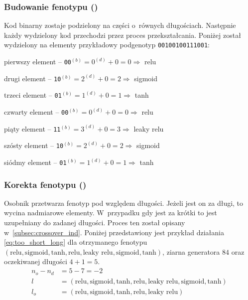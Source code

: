 \tocless\subsubsection{%
  Budowanie fenotypu
  ()%
}
Kod binarny zostaje podzielony
na części o~równych długościach.
Następnie każdy wydzielony kod przechodzi
przez proces przekształcania.
Poniżej został wydzielony na elementy
przykładowy podgenotyp \texttt{00100100111001}:
\begin{nospitemize}
  \item pierwszy element
    -- \texttt{00}$\displaystyle
      {}^{\left(b\right)}
        =0^{\left(d\right)}+0
        =0
    \Rightarrow$ relu
  \item drugi element
    -- \texttt{10}$\displaystyle
      {}^{\left(b\right)}
        =2^{\left(d\right)}+0
        =2
    \Rightarrow$ sigmoid
  \item trzeci element
    -- \texttt{01}$\displaystyle
      {}^{\left(b\right)}
        =1^{\left(d\right)}+0
        =1
    \Rightarrow$ tanh
  \item czwarty element
    -- \texttt{00}$\displaystyle
      {}^{\left(b\right)}
        =0^{\left(d\right)}+0
        =0
    \Rightarrow$ relu
  \item piąty element
    -- \texttt{11}$\displaystyle
      {}^{\left(b\right)}
        =3^{\left(d\right)}+0
        =3
    \Rightarrow$ leaky relu
  \item szósty element
    -- \texttt{10}$\displaystyle
      {}^{\left(b\right)}
        =2^{\left(d\right)}+0
        =2
    \Rightarrow$ sigmoid
  \item siódmy element
    -- \texttt{01}$\displaystyle
      {}^{\left(b\right)}
        =1^{\left(d\right)}+0
        =1
    \Rightarrow$ tanh
\end{nospitemize}

\tocless\subsubsection{%
  Korekta fenotypu
  ()%
}
Osobnik przetwarza fenotyp pod względem długości.
Jeżeli jest on za długi, to wycina nadmiarowe elementy.
W~przypadku gdy jest za krótki to
jest uzupełniany do zadanej długości.
Proces ten został opisany w~\cref{subsec:crossover_ind}.
Poniżej przedstawiony jest przykład działania
\cref{eq:too_short_long} dla otrzymanego fenotypu $\left(
  \text{relu},
  \text{sigmoid},
  \text{tanh},
  \text{relu},
  \text{leaky relu},
  \text{sigmoid},
  \text{tanh}
\right)$, ziarna generatora $84$
oraz oczekiwanej długości $4+1=5$.
$$\begin{aligned}
  n_o-n_d&=5-7=-2\\
  l&=\left(
    \text{relu},
    \text{sigmoid},
    \text{tanh},
    \text{relu},
    \text{leaky relu},
    \text{sigmoid},
    \text{tanh}
  \right)\\
  l_o&=\left(
    \text{relu},
    \text{sigmoid},
    \text{tanh},
    \text{relu},
    \text{leaky relu}
  \right)\\
\end{aligned}$$

